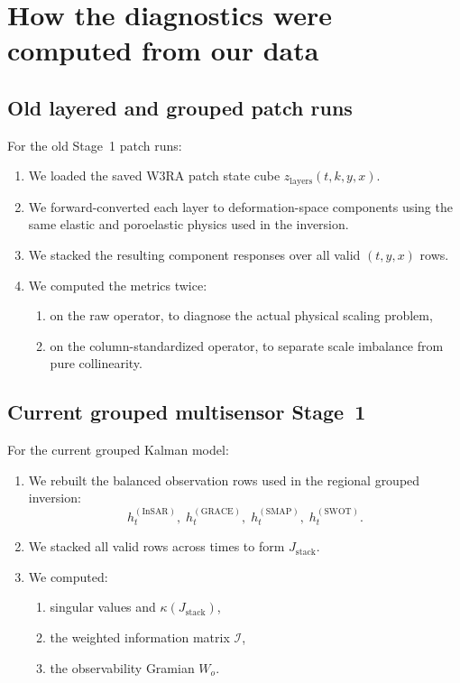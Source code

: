 \documentclass[11pt]{article}
\begin{document}
\section{How the diagnostics were computed from our data}

\subsection{Old layered and grouped patch runs}

For the old Stage~1 patch runs:
\begin{enumerate}
    \item We loaded the saved W3RA patch state cube $z_{\mathrm{layers}}(t,k,y,x)$.
    \item We forward-converted each layer to deformation-space components using the same elastic and poroelastic physics used in the inversion.
    \item We stacked the resulting component responses over all valid $(t,y,x)$ rows.
    \item We computed the metrics twice:
    \begin{enumerate}
        \item on the raw operator, to diagnose the actual physical scaling problem,
        \item on the column-standardized operator, to separate scale imbalance from pure collinearity.
    \end{enumerate}
\end{enumerate}

\subsection{Current grouped multisensor Stage~1}

For the current grouped Kalman model:
\begin{enumerate}
    \item We rebuilt the balanced observation rows used in the regional grouped inversion:
    \begin{equation}
    h_t^{(\mathrm{InSAR})},\;
    h_t^{(\mathrm{GRACE})},\;
    h_t^{(\mathrm{SMAP})},\;
    h_t^{(\mathrm{SWOT})}.
    \end{equation}
    \item We stacked all valid rows across times to form $J_{\mathrm{stack}}$.
    \item We computed:
    \begin{enumerate}
        \item singular values and $\kappa(J_{\mathrm{stack}})$,
        \item the weighted information matrix $\mathcal{I}$,
        \item the observability Gramian $W_o$.
    \end{enumerate}
\end{enumerate}
\end{document}
